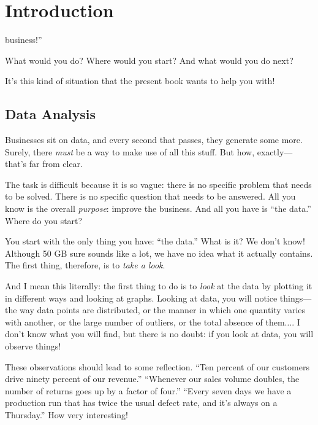 

\chapter{Introduction}{}{}
\label{ch:intro}

\vspace*{-12pt}
 business!'' 

What would you do? Where would you start? And what would you do next?

It's this kind of situation that the present book wants to help you with!

\section{Data Analysis}


Businesses sit on data, and every second that passes, they generate
some more. Surely, there \emph{must} be a way to make use of all this
stuff. But how, exactly---that's far from clear.

The task is difficult because it is so vague: there is no specific
problem that needs to be solved. There is no specific question that
needs to be answered. All you know is the overall \emph{purpose}:
improve the business. And all you have is ``the data.'' Where do
you start?

You start with the only thing you have: ``the data.'' What is it? We
don't know! Although 50 GB sure sounds like a lot, we have no idea
what it actually contains. The first thing, therefore, is to
\emph{take a look}.

And I mean this literally: the first thing to do is to \emph{look} at
the data by plotting it in different ways and looking at graphs.
Looking at data, you will notice things---the way data points are
distributed, or the manner in which one quantity varies with another,
or the large number of outliers, or the total absence of them$\dots.$ I
don't know what you will find, but there is no doubt: if you look at
data, you will observe things!

These observations should lead to some reflection. ``Ten percent of
our customers drive ninety percent of our revenue.'' ``Whenever
our sales volume doubles, the number of returns goes up by a factor of
four.'' ``Every seven days we have a production run that has twice
the usual defect rate, and it's always on a Thursday.'' How very
interesting!

